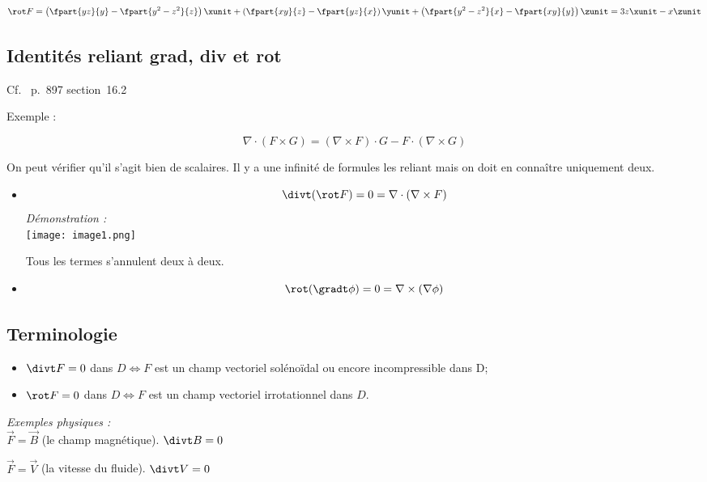 \[
  \rot F 
  = \left(\fpart{yz}{y} - \fpart{y^2 - z^2}{z}\right) \xunit
  + \left( \fpart{xy}{z} -  \fpart{yz}{x}\right) \yunit
  + \left( \fpart{y^2 - z^2}{x} -  \fpart{xy}{y}\right) \zunit
  = 3z \xunit - x \zunit
\]



 \subsection{Identités reliant grad, div et rot}

 Cf.~\cite{adams2013calculus} p.~897 section~16.2

 Exemple :

 \[\nabla \cdot ( F \times G) = ( \nabla \times F) \cdot G - F \cdot(\nabla \times G ) \]

 On peut vérifier qu'il s'agit bien de scalaires. Il y a une infinité de formules les reliant mais on doit en connaître uniquement deux.

 \begin{itemize}
 \item
 \[\divt(\rot F ) = 0 = \nabla \cdot ( \nabla \times F ) \]
\textit{Démonstration :} \\

 \texttt{[image: image1.png]}

 Tous les termes s'annulent deux à deux.
 \item
 \[\rot ( \gradt\phi) =0 = \nabla \times ( \nabla \phi ) \]

 \end{itemize}
 \subsection{Terminologie}
\begin{itemize}


\item
 $\divt F = 0$ dans $D \Leftrightarrow F$ est un champ vectoriel \og solénoïdal \fg{} ou encore \og incompressible \fg{} dans D;

\item $\rot F = 0$ dans $D \Leftrightarrow F$ est un champ vectoriel \og irrotationnel \fg{} dans $D$.

\end{itemize}
\textit{ Exemples physiques :} \\

 $\vec F= \vec B$ (le champ magnétique). $\divt B = 0$

 $\vec F= \vec V$ (la vitesse du fluide). $\divt V = 0$

